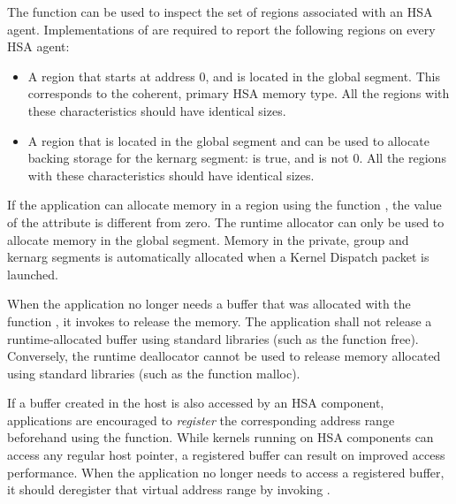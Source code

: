 \documentclass[final,oneside]{book}
\begin{document}
The function  can be used to inspect the set
of regions associated with an HSA agent. Implementations of
 are required to report the following
regions on every HSA agent:
\begin{itemize}[itemsep=1pt,topsep=3pt,partopsep=0pt]
\item A region that starts at address 0, and is located in the global
  segment. This corresponds to the coherent, primary HSA memory type. All the
  regions with these characteristics should have identical sizes.
\item A region that is located in the global segment and can be used to allocate
  backing storage for the kernarg segment:  is
  true, and  is not 0. All the regions
  with these characteristics should have identical sizes.
\end{itemize}

If the application can allocate memory in a region using the function
, the value of the attribute
 is different from zero. The runtime
allocator can only be used to allocate memory in the global segment. Memory in
the private, group and kernarg segments is automatically allocated when a
Kernel Dispatch packet is launched.

When the application no longer needs a buffer that was allocated with the
function , it invokes  to
release the memory. The application shall not release a runtime-allocated buffer
using standard libraries (such as the function free). Conversely, the runtime
deallocator cannot be used to release memory allocated using standard libraries
(such as the function malloc).

If a buffer created in the host is also accessed by an HSA component,
applications are encouraged to \emph{register} the corresponding address range
beforehand using the  function. While kernels
running on HSA components can access any regular host pointer, a registered
buffer can result on improved access performance.  When the application no
longer needs to access a registered buffer, it should deregister that virtual
address range by invoking .
\end{document}
